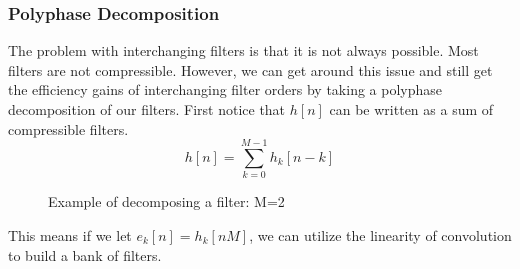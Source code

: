 \subsubsection{Polyphase Decomposition}
The problem with interchanging filters is that it is not always possible. Most filters are not compressible. However, we can get around this issue
and still get the efficiency gains of interchanging filter orders by taking a polyphase decomposition of our filters. First notice that $h[n]$ can be written
as a sum of compressible filters.
\[
  h[n] = \sum_{k=0}^{M-1}h_k[n-k]
\]
\begin{gitbook-image}
\begin{figure}[h!]
  \centering
  \caption{Example of decomposing a filter: M=2}
  \label{fig:compressible-filter}
\end{figure}
\end{gitbook-image}
This means if we let $e_k[n] = h_k[nM]$, we can utilize the linearity of convolution to build a bank of filters.
